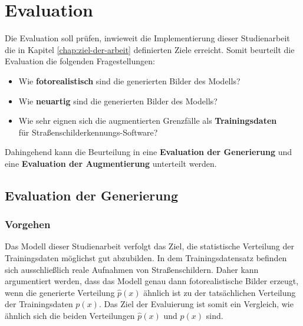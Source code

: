 \chapter{Evaluation}

Die Evaluation soll prüfen, inwieweit die Implementierung dieser Studienarbeit die in Kapitel \ref{chap:ziel-der-arbeit} definierten Ziele erreicht. Somit beurteilt die Evaluation die folgenden Fragestellungen:
\begin{itemize}
	\item Wie \textbf{fotorealistisch} sind die generierten Bilder des Modells? 
	\item Wie \textbf{neuartig} sind die generierten Bilder des Modells?
	\item Wie sehr eignen sich die augmentierten Grenzfälle als \textbf{Trainingsdaten} \\ für Straßenschilderkennungs-Software?
\end{itemize}

Dahingehend kann die Beurteilung in eine \textbf{Evaluation der Generierung} und eine \textbf{Evaluation der Augmentierung} unterteilt werden.

\label{chap:Evaluation}
\section{Evaluation der Generierung}

\subsection{Vorgehen}

Das Modell dieser Studienarbeit verfolgt das Ziel, die statistische Verteilung der Trainingsdaten möglichst gut abzubilden. In dem Trainingsdatensatz befinden sich ausschließlich reale Aufnahmen von Straßenschildern. Daher kann argumentiert werden, dass das Modell genau dann fotorealistische Bilder erzeugt, wenn die generierte Verteilung $\hat{p}(x)$ ähnlich ist zu der tatsächlichen Verteilung der Trainingsdaten $p(x)$. Das Ziel der Evaluierung ist somit ein Vergleich, wie ähnlich sich die beiden Verteilungen $\hat{p}(x)$ und $p(x)$ sind.

